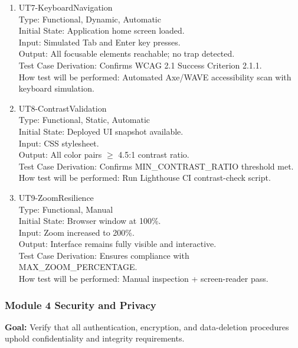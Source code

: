 \documentclass[12pt, titlepage]{article}
\begin{document}
\begin{enumerate}
\item{UT7-KeyboardNavigation\\}
Type: Functional, Dynamic, Automatic\\
Initial State: Application home screen loaded.\\
Input: Simulated Tab and Enter key presses.\\
Output: All focusable elements reachable; no trap detected.\\
Test Case Derivation: Confirms WCAG 2.1 Success Criterion 2.1.1.\\
How test will be performed: Automated Axe/WAVE accessibility scan with keyboard simulation.

\item{UT8-ContrastValidation\\}
Type: Functional, Static, Automatic\\
Initial State: Deployed UI snapshot available.\\
Input: CSS stylesheet.\\
Output: All color pairs $\geq$ 4.5:1 contrast ratio.\\
Test Case Derivation: Confirms MIN\_CONTRAST\_RATIO threshold met.\\
How test will be performed: Run Lighthouse CI contrast-check script.

\item{UT9-ZoomResilience\\}
Type: Functional, Manual\\
Initial State: Browser window at 100\%.\\
Input: Zoom increased to 200\%.\\
Output: Interface remains fully visible and interactive.\\
Test Case Derivation: Ensures compliance with MAX\_ZOOM\_PERCENTAGE.\\
How test will be performed: Manual inspection + screen-reader pass.
\end{enumerate}

\subsubsection{Module 4 \textemdash{} Security and Privacy}

\textbf{Goal:} Verify that all authentication, encryption, and data-deletion procedures uphold confidentiality and integrity requirements.
\end{document}
